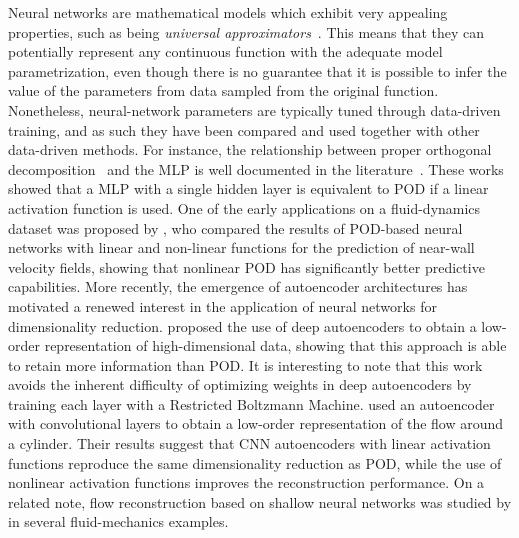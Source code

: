 Neural networks are mathematical models which exhibit very appealing properties, such as being \textit{universal approximators}~\citep{hornik1989multilayer}.
This means that they can potentially represent any continuous function with the adequate model parametrization, even though there is no guarantee that it is possible to infer the value of the parameters from data sampled from the original function.
Nonetheless, neural-network parameters are typically tuned through data-driven training, and as such they have been compared and used together with other data-driven methods.
For instance, the relationship between proper orthogonal decomposition~\cite[POD, see][]{lumley1967structure} and the MLP is well documented in the literature~\citep{bourlard1988auto,baldi1989neural}.
These works showed that a MLP with a single hidden layer is equivalent to POD if a linear activation function is used.
One of the early applications on a fluid-dynamics dataset was proposed by \citet{milano2002neural}, who compared the results of POD-based neural networks with linear and non-linear functions for the prediction of near-wall velocity fields, showing that nonlinear POD has significantly better predictive capabilities.
More recently, the emergence of autoencoder architectures has motivated a renewed interest in the application of neural networks for dimensionality reduction.
\citet{hinton2006reducing} proposed the use of deep autoencoders to obtain a low-order representation of high-dimensional data, showing that this approach is able to retain more information than POD.
It is interesting to note that this work avoids the inherent difficulty of optimizing weights in deep autoencoders by training each layer with a Restricted Boltzmann Machine.
\citet{murata2020nonlinear} used an autoencoder with convolutional layers to obtain a low-order representation of the flow around a cylinder.
Their results suggest that CNN autoencoders with linear activation functions reproduce the same dimensionality reduction as POD, while the use of nonlinear activation functions improves the reconstruction performance.
On a related note, flow reconstruction based on shallow neural networks was studied by \cite{erichson2020shallow} in several fluid-mechanics examples.

